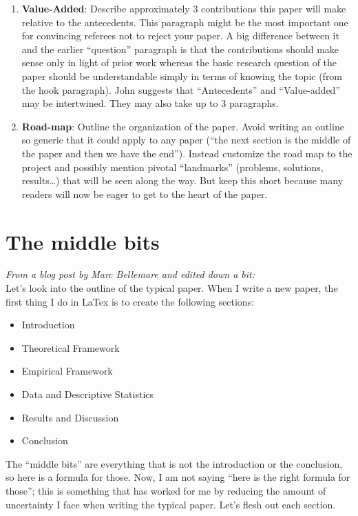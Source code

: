 \begin{enumerate}
\item \textbf{Value-Added}: Describe approximately 3 contributions this paper will make relative to the antecedents. This paragraph might be the most important one for convincing referees not to reject your paper. A big difference between it and the earlier ``question'' paragraph is that the contributions should make sense only in light of prior work whereas the basic research question of the paper should be understandable simply in terms of knowing the topic (from the hook paragraph). John suggests that ``Antecedents'' and ``Value-added'' may be intertwined. They may also take up to 3 paragraphs.

\item \textbf{Road-map}: Outline the organization of the paper. Avoid writing an outline so generic that it could apply to any paper (``the next section is the middle of the paper and then we have the end''). Instead customize the road map to the project and possibly mention pivotal ``landmarks'' (problems, solutions, results…) that will be seen along the way. But keep this short because many readers will now be eager to get to the heart of the paper.
\end{enumerate}

\section{The middle bits}
\textit{From a blog post by Marc Bellemare and edited down a bit:}\\
Let’s look into the outline of the typical paper. When I write a new paper, the first thing I do in LaTex is to create the following sections:
\begin{itemize}
\item Introduction
\item Theoretical Framework
\item Empirical Framework
\item Data and Descriptive Statistics
\item Results and Discussion
\item Conclusion
\end{itemize}
The ``middle bits'' are everything that is not the introduction or the conclusion, so here is a formula for those. Now, I am not saying ``here is the right formula for those''; this is something that has worked for me by reducing the amount of uncertainty I face when writing the typical paper. Let's flesh out each section.

